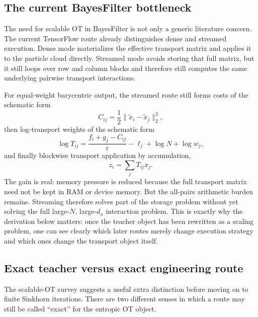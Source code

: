 \subsection{The current BayesFilter bottleneck}
\label{sec:bf-eot-current-bottleneck}

The need for scalable OT in BayesFilter is not only a generic literature concern.
The current TensorFlow route already distinguishes dense and streamed execution.
Dense mode materializes the effective transport matrix and applies it to the
particle cloud directly.  Streamed mode avoids storing that full matrix, but it
still loops over row and column blocks and therefore still computes the same
underlying pairwise transport interactions.

For equal-weight barycentric output, the streamed route still forms costs of the
schematic form
\begin{equation}
\label{eq:bf-eot-current-cost}
  C_{ij}
  =
  \frac{1}{2}\|\tilde x_i-\tilde x_j\|_2^2,
\end{equation}
then log-transport weights of the schematic form
\begin{equation}
\label{eq:bf-eot-current-log-transport}
  \log T_{ij}
  =
  \frac{f_i+g_j-C_{ij}}{\varepsilon}
  - \ell_j
  + \log N
  + \log w_j,
\end{equation}
and finally blockwise transport application by accumulation,
\begin{equation}
\label{eq:bf-eot-current-streamed-application}
  z_i = \sum_j T_{ij}x_j.
\end{equation}
The gain is real: memory pressure is reduced because the full transport matrix need
not be kept in RAM or device memory.  But the all-pairs arithmetic burden remains.
Streaming therefore solves part of the storage problem without yet solving the full
large-\(N\), large-\(d_x\) interaction problem.  This is exactly why the derivation
below matters: once the teacher object has been rewritten as a scaling problem, one
can see clearly which later routes merely change execution strategy and which ones
change the transport object itself.

\subsection{Exact teacher versus exact engineering route}
\label{sec:bf-eot-teacher-versus-engineering}

The scalable-OT survey suggests a useful extra distinction before moving on to
finite Sinkhorn iterations.  There are two different senses in which a route may
still be called ``exact'' for the entropic OT object.

